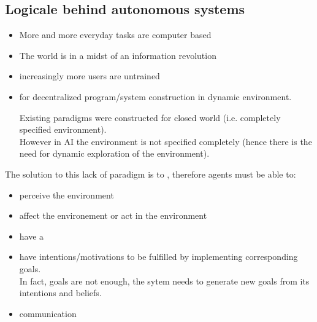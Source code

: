 \subsection{Logicale behind autonomous systems}
\begin{itemize}
\item More and more everyday tasks are computer based
\item The world is in a midst of an information revolution
\item increasingly more users are untrained
\item {} for decentralized program/system construction in dynamic environment.

Existing paradigms were constructed for closed world (i.e. completely specified environment).\\
However in AI the environment is not specified completely (hence there is the need for dynamic exploration of the environment).
\end{itemize}

The solution to this lack of paradigm is to , therefore agents must be able to:
\begin{itemize}
\item perceive the environment
\item affect the environement or act in the environment
\item have a 
\item have intentions/motivations to be fulfilled by implementing corresponding goals.\\
In fact, goals are not enough, the sytem needs to generate new goals from its intentions and beliefs.
\item communication
\end{itemize}

